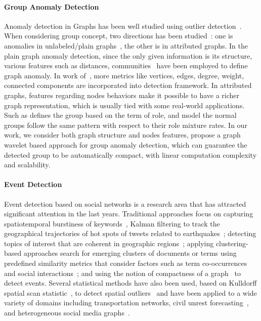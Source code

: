 \paragraph{Group Anomaly Detection}
Anomaly detection in Graphs has been well studied using outlier detection~\cite{akoglu2009anomaly}. When considering group concept, two directions has been studied~\cite{akoglu2015graph}: one is anomalies in unlabeled/plain graphs~\cite{noble2003graph}, the other is in attributed graphs. In the plain graph anomaly detection, since the only given information is its structure, various features such as distances, communities~\cite{sun2005neighborhood} have been employed to define graph anomaly. In work of~\cite{henderson2010metric}, more metrics like vertices, edges, degree, weight, connected components are incorporated into detection framework. In attributed graphs, features regarding nodes behaviors make it possible to have a richer graph representation, which is usually tied with some real-world applications. Such as \cite{yu2014glad} defines the group based on the term of role, and model the normal groups follow the same pattern with respect to their role mixture rates. In our work, we consider both graph structure and nodes features, propose a graph wavelet based approach for group anomaly detection, which can guarantee the detected group to be automatically compact, with linear computation complexity and scalability.


\paragraph{Event Detection}
Event detection based on social networks is a research area that has attracted significant attention in the last years. Traditional approaches focus on capturing spatiotemporal burstiness of keywords~\cite{lappas2009burstiness,lappas2012spatiotemporal}, Kalman filtering to track the geographical trajectories of hot spots of tweets related to earthquakes~\cite{sakaki2010earthquake}; detecting topics of interest that are coherent in geographic regions~\cite{eisenstein2010latent,hong2012discovering,yin2011geographical}; applying clustering-based approaches search for emerging clusters of documents or terms using predefined similarity metrics that consider factors such as term co-occurrences and social interactions~\cite{aggarwal2012event,sayyadi2009event,watanabe2011jasmine,weng2011event}; and using the notion of compactness of a graph~\cite{rozenshtein2014event} to detect events. Several statistical methods have also been used, based on Kulldorff  spatial scan statistic~\cite{kulldorff1997spatial}, to detect spatial outliers~\cite{chen2008detecting} and have been applied to a wide variety of domains including transportation networks, civil unrest forecasting~\cite{zhao2014unsupervised}, and heterogeneous social media graphs~\cite{chen2014non}.



